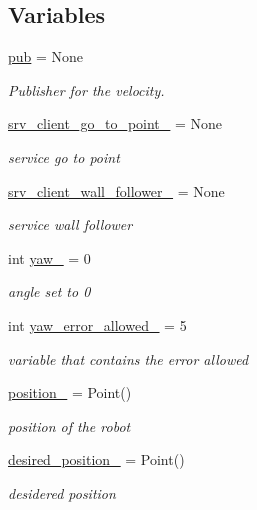 \subsection*{Variables}
\begin{DoxyCompactItemize}
\item 
\hyperlink{namespacebug__m_adc14150838edf40c8028207cd6bb2082}{pub} = None
\begin{DoxyCompactList}\small\item\em Publisher for the velocity. \end{DoxyCompactList}\item 
\hyperlink{namespacebug__m_abd32bbd25b55f71e56505e72ba56c2f6}{srv\+\_\+client\+\_\+go\+\_\+to\+\_\+point\+\_\+} = None
\begin{DoxyCompactList}\small\item\em service go to point \end{DoxyCompactList}\item 
\hyperlink{namespacebug__m_af40e8063430e5b54ef2f3f8368338744}{srv\+\_\+client\+\_\+wall\+\_\+follower\+\_\+} = None
\begin{DoxyCompactList}\small\item\em service wall follower \end{DoxyCompactList}\item 
int \hyperlink{namespacebug__m_a8b5b5c9259592b8efd526c5adb95d95b}{yaw\+\_\+} = 0
\begin{DoxyCompactList}\small\item\em angle set to 0 \end{DoxyCompactList}\item 
int \hyperlink{namespacebug__m_a23e5e76f14d9d0d139767cb229a53dda}{yaw\+\_\+error\+\_\+allowed\+\_\+} = 5
\begin{DoxyCompactList}\small\item\em variable that contains the error allowed \end{DoxyCompactList}\item 
\hyperlink{namespacebug__m_ab108d02234aa3ec58605b9f6980ec090}{position\+\_\+} = Point()
\begin{DoxyCompactList}\small\item\em position of the robot \end{DoxyCompactList}\item 
\hyperlink{namespacebug__m_a8fb60e35f164091fe3355d3a0bce95af}{desired\+\_\+position\+\_\+} = Point()
\begin{DoxyCompactList}\small\item\em desidered position \end{DoxyCompactList}\item 

\end{DoxyCompactItemize}
